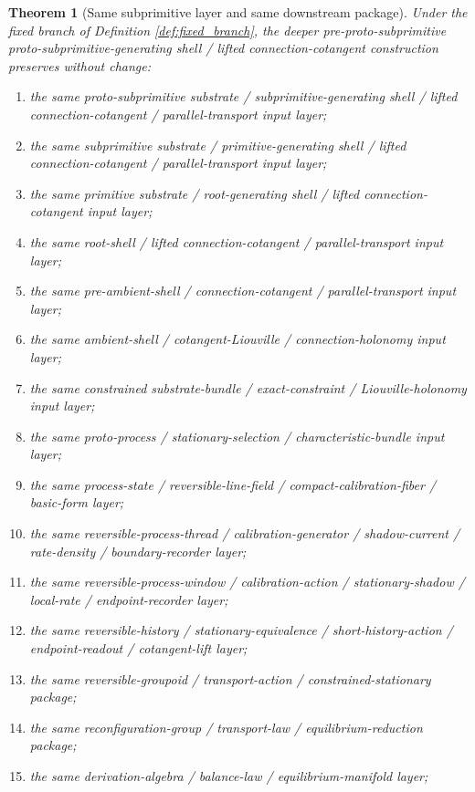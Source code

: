 \documentclass[11pt]{article}
\newtheorem{theorem}{Theorem}
\begin{document}
\begin{theorem}[Same subprimitive layer and same downstream package]
\label{thm:same_package}
Under the fixed branch of Definition \ref{def:fixed_branch}, the deeper pre-proto-subprimitive proto-subprimitive-generating shell / lifted connection-cotangent construction preserves without change:
\begin{enumerate}
    \item the same proto-subprimitive substrate / subprimitive-generating shell / lifted connection-cotangent / parallel-transport input layer;
    \item the same subprimitive substrate / primitive-generating shell / lifted connection-cotangent / parallel-transport input layer;
    \item the same primitive substrate / root-generating shell / lifted connection-cotangent input layer;
    \item the same root-shell / lifted connection-cotangent / parallel-transport input layer;
    \item the same pre-ambient-shell / connection-cotangent / parallel-transport input layer;
    \item the same ambient-shell / cotangent-Liouville / connection-holonomy input layer;
    \item the same constrained substrate-bundle / exact-constraint / Liouville-holonomy input layer;
    \item the same proto-process / stationary-selection / characteristic-bundle input layer;
    \item the same process-state / reversible-line-field / compact-calibration-fiber / basic-form layer;
    \item the same reversible-process-thread / calibration-generator / shadow-current / rate-density / boundary-recorder layer;
    \item the same reversible-process-window / calibration-action / stationary-shadow / local-rate / endpoint-recorder layer;
    \item the same reversible-history / stationary-equivalence / short-history-action / endpoint-readout / cotangent-lift layer;
    \item the same reversible-groupoid / transport-action / constrained-stationary package;
    \item the same reconfiguration-group / transport-law / equilibrium-reduction package;
    \item the same derivation-algebra / balance-law / equilibrium-manifold layer;

\end{enumerate}
\end{theorem}
\end{document}
